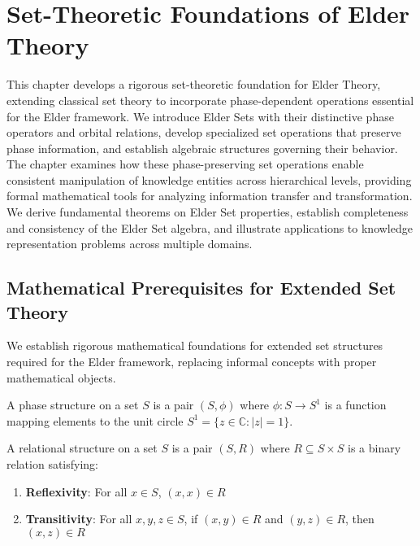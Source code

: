\chapter{Set-Theoretic Foundations of Elder Theory}

\begin{tcolorbox}[colback=DarkSkyBlue!5!white,colframe=DarkSkyBlue!75!black,title=Chapter Summary]
This chapter develops a rigorous set-theoretic foundation for Elder Theory, extending classical set theory to incorporate phase-dependent operations essential for the Elder framework. We introduce Elder Sets with their distinctive phase operators and orbital relations, develop specialized set operations that preserve phase information, and establish algebraic structures governing their behavior. The chapter examines how these phase-preserving set operations enable consistent manipulation of knowledge entities across hierarchical levels, providing formal mathematical tools for analyzing information transfer and transformation. We derive fundamental theorems on Elder Set properties, establish completeness and consistency of the Elder Set algebra, and illustrate applications to knowledge representation problems across multiple domains.
\end{tcolorbox}

\section{Mathematical Prerequisites for Extended Set Theory}

We establish rigorous mathematical foundations for extended set structures required for the Elder framework, replacing informal concepts with proper mathematical objects.

\begin{definition}
\label{def:phase_structure}
A phase structure on a set $S$ is a pair $(S, \phi)$ where $\phi: S \to S^1$ is a function mapping elements to the unit circle $S^1 = \{z \in \mathbb{C} : |z| = 1\}$.
\end{definition}

\begin{definition}
\label{def:relational_structure}
A relational structure on a set $S$ is a pair $(S, R)$ where $R \subseteq S \times S$ is a binary relation satisfying:
\begin{enumerate}
\item \textbf{Reflexivity}: For all $x \in S$, $(x,x) \in R$
\item \textbf{Transitivity}: For all $x,y,z \in S$, if $(x,y) \in R$ and $(y,z) \in R$, then $(x,z) \in R$
\end{enumerate}
\end{definition}

